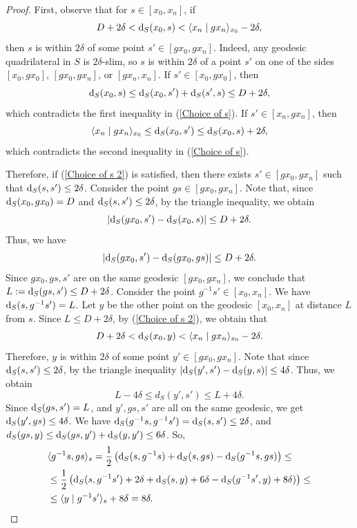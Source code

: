 \documentclass[11pt,letterpaper]{article}
\renewcommand{\d}{{\rm d}}
\renewcommand{\d}{{\rm d}}
\theoremstyle{definition}
\theoremstyle{remark}
\begin{document}
\begin{proof}
First, observe that for $s \in [x_0, x_n]$, if 
\begin{equation}\label{Choice of s}
D+2\delta < \d_S(x_0, s) < \langle x_n \mid gx_n \rangle_{x_0}- 2\delta,
\end{equation}
then $s$ is within $2\delta$ of some point $s' \in [gx_0,gx_n]$. Indeed, any geodesic quadrilateral in $S$ is $2\delta$-slim, so $s$ is within $2\delta$ of a point $s'$ on one of the sides $[x_0,gx_0]$, $[gx_0,gx_n]$, or $[gx_n,x_n]$.
If $s' \in [x_0, gx_0]$, then $$
\d_S(x_0,s) \leq \d_S(x_0,s')+\d_S(s',s) \leq D+2\delta,$$
which contradicts the first inequality in (\ref{Choice of s}).
If $s' \in [x_n, gx_n]$, then $$
\langle x_n \mid gx_n \rangle_{x_0} \leq \d_S(x_0, s') \leq \d_S(x_0,s)+2\delta,
$$ which contradicts the second inequality in (\ref{Choice of s}).

Therefore, if (\ref{Choice of s 2}) is satisfied, then there exists $s' \in [gx_0, gx_n]$ such that $\d_S(s, s') \leq 2\delta$. Consider the point $gs \in [gx_0, gx_n]$.
Note that, since $\d_S(x_0, gx_0) = D$ and $\d_S(s, s') \leq 2\delta$, by the triangle inequality, we obtain
$$
|\d_S(gx_0, s') - \d_S(x_0, s)| \leq D+2\delta.
$$
Thus, we have
$$
|\d_S(gx_0, s') - \d_S(gx_0,gs)| \leq D+2\delta.
$$
Since $gx_0, gs, s'$ are on the same geodesic $[gx_0, gx_n]$, we conclude that $L := \d_S(gs, s') \leq D+ 2\delta$. 
Consider the point $g^{-1}s' \in [x_0, x_n]$. We have $\d_S(s, g^{-1}s')=L$. Let $y$ be the other point on the geodesic $[x_0, x_n]$ at distance $L$ from $s$. Since $L\leq D+ 2\delta$, by (\ref{Choice of s 2}), we obtain that
$$
D+2\delta < \d_S(x_0, y) < \langle x_n \mid gx_n \rangle_{x_0}- 2\delta.
$$
Therefore, $y$ is within $2\delta$ of some point $y' \in [gx_0, gx_n]$.
Note that since $\d_S(s, s')\leq 2\delta$, by the triangle inequality
$|\d_S(y', s') - \d_S(y,s)| \leq 4\delta$.
Thus, we obtain
$$
L-4\delta \leq d_S(y', s') \leq L+4\delta.
$$
Since $\d_S(gs, s') =L$, and $y', gs, s'$ are all on the same geodesic, we get
$\d_S(y', gs) \leq 4\delta$.
We have $\d_S(g^{-1}s, g^{-1}s')=\d_S(s, s') \leq 2\delta$,
and $d_S(gs, y) \leq \d_S(gs, y')+\d_S(y, y') \leq 6\delta$.
So,
$$ 
\begin{aligned}
&\langle g^{-1}s, gs\rangle_s= \frac{1}{2}\left(\d_S(s, g^{-1}s)+\d_S(s, gs)-\d_S(g^{-1}s, gs)\right)\leq \\
&\leq \frac{1}{2}\left(\d_S(s, g^{-1}s')+2\delta
+ \d_S(s,y)+6\delta -\d_S(g^{-1}s', y)+8\delta)\right) \leq\\
&\leq \langle y \mid g^{-1}s'\rangle_s + 8\delta = 8\delta.
\end{aligned}
$$
\end{proof}
\end{document}
